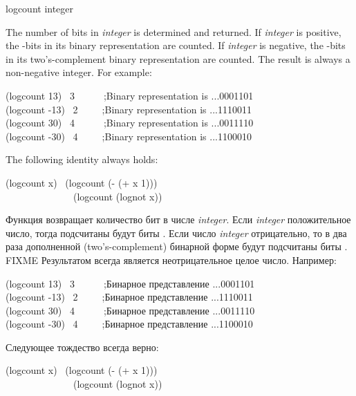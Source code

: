 \begin{defun}[Function]
logcount integer

The number of bits in \emph{integer} is determined and returned.
If \emph{integer} is positive, the -bits in its binary
representation are counted.  If \emph{integer} is negative,
the -bits in its two's-complement binary representation are counted.
The result is always a non-negative integer.
For example:
\begin{lisp}
(logcount 13) \EV\ 3~~~~~~;\textrm{Binary representation is} ...0001101 \\
(logcount -13) \EV\ 2~~~~~;\textrm{Binary representation is} ...1110011 \\
(logcount 30) \EV\ 4~~~~~~;\textrm{Binary representation is} ...0011110 \\
(logcount -30) \EV\ 4~~~~~;\textrm{Binary representation is} ...1100010
\end{lisp}
The following identity always holds:
\begin{lisp}
(logcount x) \EQ\ (logcount (- (+ x 1))) \\
~~~~~~~~~~~~~\EQ\ (logcount (lognot x))
\end{lisp}

Функция возвращает количество бит в числе \emph{integer}.
Если \emph{integer} положительное число, тогда подсчитаны будут биты
. Если число \emph{integer} отрицательно, то в два раза дополненной
(two's-complement) бинарной форме будут подсчитаны биты
. FIXME 
Результатом всегда является неотрицательное целое число.
Например:
\begin{lisp}
(logcount 13) \EV\ 3~~~~~~;\textrm{Бинарное представление} ...0001101 \\
(logcount -13) \EV\ 2~~~~~;\textrm{Бинарное представление} ...1110011 \\
(logcount 30) \EV\ 4~~~~~~;\textrm{Бинарное представление} ...0011110 \\
(logcount -30) \EV\ 4~~~~~;\textrm{Бинарное представление} ...1100010
\end{lisp}
Следующее тождество всегда верно:
\begin{lisp}
(logcount x) \EQ\ (logcount (- (+ x 1))) \\
~~~~~~~~~~~~~\EQ\ (logcount (lognot x))
\end{lisp}
\end{defun}

